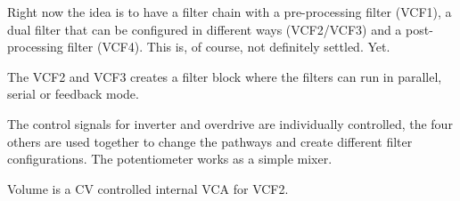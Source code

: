 \documentclass[12pt]{article}
\begin{document}
\bigskip

Right now the idea is to have a filter chain with a pre-processing filter (VCF1),
a dual filter that can be configured in different ways (VCF2/VCF3) and a post-processing
filter (VCF4). This is, of course, not definitely settled. Yet.

\bigskip


The VCF2 and VCF3 creates a filter block where the filters can run in parallel,
serial or feedback mode.

The control signals for inverter and overdrive are individually controlled, the four others are used
together to change the pathways and create different filter configurations.
The potentiometer works as a simple mixer.

Volume is a CV controlled internal VCA for VCF2.

\bigskip
\end{document}
